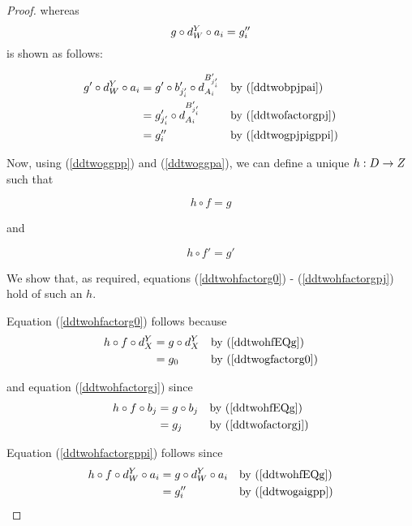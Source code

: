 \documentclass[10pt,a4paper]{scrartcl}
\begin{document}
\begin{proof}
\noindent
whereas
\begin{equation}
\label{ddtwogpaigpp}
g \circ d^{Y}_{W} \circ a_i=g''_i
\end{equation}
is shown as follows:

\begin{align*}
g' \circ d^{Y}_{W} \circ a_i                      
     &= g' \circ b'_{j'_i} \circ d^{B'_{j'_i}}_{A_i} && \mbox{by (\ref{ddtwobpjpai})}  \\
     &= g'_{j'_i} \circ d^{B'_{j'_i}}_{A_i}          && \mbox{by (\ref{ddtwofactorgpj})}  \\
		&=g''_i                                          && \mbox{by (\ref{ddtwogpjpigppi})}  \\
\end{align*}


\noindent
Now, using (\ref{ddtwoggpp}) and (\ref{ddtwoggpa}), we can define a unique $h:D \rightarrow Z$ such that

\begin{equation}
  \label{ddtwohfEQg}
	h \circ f =g
\end{equation}

and

\begin{equation}
  \label{ddtwohfpEQgp}
	h \circ f' =g'
\end{equation}


\noindent
We show that, as required, equations (\ref{ddtwohfactorg0}) - (\ref{ddtwohfactorgpj}) hold of such an $h$.

\noindent
Equation (\ref{ddtwohfactorg0}) follows because
\begin{align*}
h \circ f \circ d^{Y}_{X} & = g \circ d^{Y}_{X} && \mbox{by (\ref{ddtwohfEQg})} \\
                          & = g_0               && \mbox{by (\ref{ddtwogfactorg0})}  
\end{align*}

\noindent
and equation (\ref{ddtwohfactorgj}) since
\begin{align*}
h \circ f \circ b_j       &= g \circ b_j        && \mbox{by (\ref{ddtwohfEQg})} \\
                          &= g_j                && \mbox{by (\ref{ddtwofactorgj})} 
\end{align*}

\noindent
Equation (\ref{ddtwohfactorgppi}) follows since
\begin{align*}
h \circ f \circ d^{Y}_{W} \circ a_i
            &= g \circ d^{Y}_{W} \circ a_i      && \mbox{by (\ref{ddtwohfEQg})} \\
						&= g''_i                            && \mbox{by (\ref{ddtwogaigpp})}
\end{align*}


\end{proof}
\end{document}
